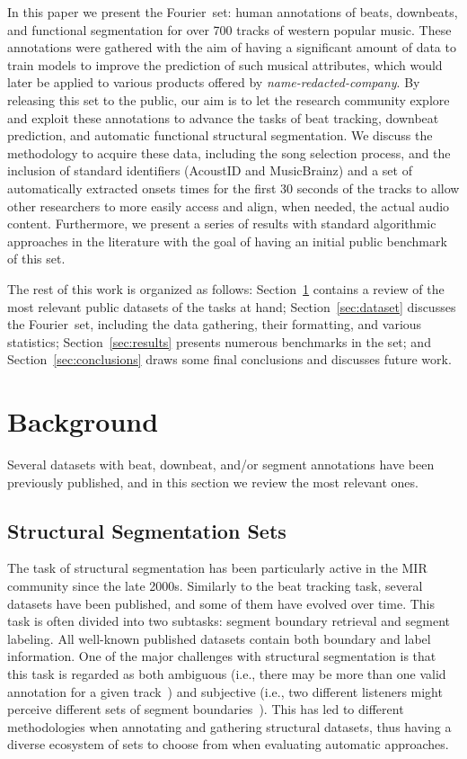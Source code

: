\documentclass{article}
\newcommand{\setName}{Fourier}
\begin{document}
In this paper we present the \setName~set: human annotations of beats, downbeats, and functional segmentation for over 700 tracks of western popular music.
These annotations were gathered with the aim of having a significant amount of data to train models to improve the prediction of such musical attributes, which would later be applied to various products offered by \textit{name-redacted-company}.
By releasing this set to the public, our aim is to let the research community explore and exploit these annotations to advance the tasks of beat tracking, downbeat prediction, and automatic functional structural segmentation.
We discuss the methodology to acquire these data, including the song selection process, and the inclusion of standard identifiers (AcoustID and MusicBrainz) and a set of automatically extracted onsets times for the first 30 seconds of the tracks to allow other researchers to more easily access and align, when needed, the actual audio content.
Furthermore, we present a series of results with standard algorithmic approaches in the literature with the goal of having an initial public benchmark of this set.

The rest of this work is organized as follows: Section~\ref{sec:background} contains a review of the most relevant public datasets of the tasks at hand; Section~\ref{sec:dataset} discusses the \setName~set, including the data gathering, their formatting, and various statistics; Section~\ref{sec:results} presents numerous benchmarks in the set; and Section~\ref{sec:conclusions} draws some final conclusions and discusses future work.
%
\section{Background}\label{sec:background}

Several datasets with beat, downbeat, and/or segment annotations have been previously published, and in this section we review the most relevant ones.



\subsection{Structural Segmentation Sets}\label{sub:structsegm}

The task of structural segmentation has been particularly active in the MIR community since the late 2000s.
Similarly to the beat tracking task, several datasets have been published, and some of them have evolved over time.
This task is often divided into two subtasks: segment boundary retrieval and segment labeling.
All well-known published datasets contain both boundary and label information.
One of the major challenges with structural segmentation is that this task is regarded as both ambiguous (i.e., there may be more than one valid annotation for a given track~\cite{McFee2017}) and subjective (i.e., two different listeners might perceive different sets of segment boundaries~\cite{Bruderer2009}).
This has led to different methodologies when annotating and gathering structural datasets, thus having a diverse ecosystem of sets to choose from when evaluating automatic approaches.
\end{document}

